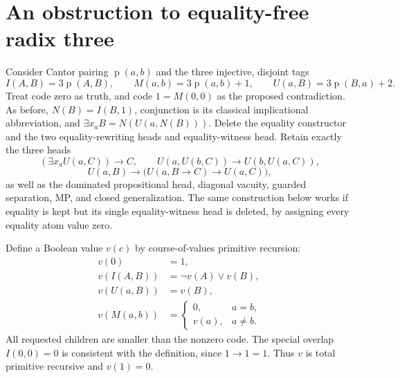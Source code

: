 \documentclass[11pt]{article}
\newcommand{\p}{\operatorname{p}}
\begin{document}
\section{An obstruction to equality-free radix three}

Consider Cantor pairing $\p(a,b)$ and the three injective, disjoint tags
\[
 I(A,B)=3\p(A,B),\qquad
 M(a,b)=3\p(a,b)+1,\qquad
 U(a,B)=3\p(B,a)+2.
\]
Treat code zero as truth, and code $1=M(0,0)$ as the proposed contradiction.
As before, $N(B)=I(B,1)$, conjunction is its classical implicational
abbreviation, and $\exists x_a B=N(U(a,N(B)))$.
Delete the equality constructor and the two equality-rewriting heads and
equality-witness head. Retain exactly the three heads
\[
 (\exists x_a U(a,C))\to C,\qquad
 U(a,U(b,C))\to U(b,U(a,C)),
\]
\[
 U(a,B)\to\bigl(U(a,B\to C)\to U(a,C)\bigr),
\]
as well as the dominated
propositional head, diagonal vacuity, guarded separation, MP, and closed
generalization. The same construction below works if equality is kept but
its single equality-witness head is deleted, by assigning every equality
atom value zero.

Define a Boolean value $v(c)$ by course-of-values primitive recursion:
\begin{align*}
 v(0)&=1,\\
 v(I(A,B))&=\neg v(A)\lor v(B),\\
 v(U(a,B))&=v(B),\\
 v(M(a,b))&=
   \begin{cases}0,&a=b,\\v(a),&a\ne b.\end{cases}
\end{align*}
All requested children are smaller than the nonzero code. The special
overlap $I(0,0)=0$ is consistent with the definition, since $1\to1=1$.
Thus $v$ is total primitive recursive and $v(1)=0$.
\end{document}
